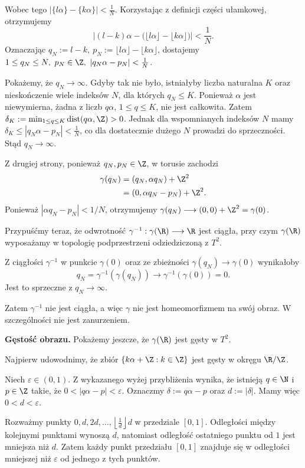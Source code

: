 \begin{uwaga}
Wobec tego $|\{l\alpha\}-\{k\alpha\}|<\frac1N$.
Korzystając z definicji części ułamkowej,
otrzymujemy
\[
\left|
(l-k)\alpha-
\bigl(\lfloor l\alpha\rfloor
-\lfloor k\alpha\rfloor\bigr)
\right|<\frac1N.
\]
Oznaczając $q_N:=l-k,\ p_N:=\lfloor l\alpha\rfloor -\lfloor k\alpha\rfloor$,
dostajemy $1\le q_N\le N,\ p_N\in\Z, \ |q_N\alpha-p_N|<\frac1N$.

Pokażemy, że $q_N\to\infty$.
Gdyby tak nie było, istniałyby liczba
naturalna $K$ oraz nieskończenie wiele
indeksów $N$, dla których $q_N\le K$.
Ponieważ $\alpha$ jest niewymierna,
żadna z liczb $q\alpha$, $1\le q\le K$,
nie jest całkowita. Zatem $\delta_K:= \min_{1\le q\le K} \operatorname{dist}(q\alpha,\Z)>0$.
Jednak dla wspomnianych indeksów $N$ mamy $\delta_K \le |q_N\alpha-p_N| <\frac1N$,
co dla dostatecznie dużego $N$ prowadzi
do sprzeczności. Stąd $q_N\to\infty$.

Z drugiej strony, ponieważ $q_N,p_N\in\Z$,
w torusie zachodzi
\[
\begin{aligned}
\gamma(q_N)
&=(q_N,\alpha q_N)+\Z^2\\
&=(0,\alpha q_N-p_N)+\Z^2.
\end{aligned}
\]
Ponieważ $|\alpha q_N-p_N|<1/N$, otrzymujemy $\gamma(q_N)\longrightarrow(0,0)+\Z^2 =\gamma(0)$.

Przypuśćmy teraz, że odwrotność $\gamma^{-1}:\gamma(\R)\longrightarrow\R$
jest ciągła, przy czym $\gamma(\R)$
wyposażamy w topologię podprzestrzeni
odziedziczoną z $T^2$.

Z ciągłości $\gamma^{-1}$ w punkcie
$\gamma(0)$ oraz ze zbieżności
$\gamma(q_N)\to\gamma(0)$ wynikałoby
\[
q_N
=\gamma^{-1}(\gamma(q_N))
\longrightarrow
\gamma^{-1}(\gamma(0))=0.
\]
Jest to sprzeczne z $q_N\to\infty$.

Zatem $\gamma^{-1}$ nie jest ciągła,
a więc $\gamma$ nie jest homeomorfizmem
na swój obraz. W szczególności nie jest
zanurzeniem.

\smallskip
\noindent\textbf{Gęstość obrazu.}
Pokażemy jeszcze, że $\gamma(\R)$ jest
gęsty w $T^2$.

Najpierw udowodnimy, że zbiór $\{k\alpha+\Z:k\in\Z\}$
jest gęsty w okręgu $\R/\Z$.

Niech $\varepsilon\in(0,1)$.
Z wykazanego wyżej przybliżenia wynika,
że istnieją $q\in\N$ i $p\in\Z$ takie, że $0<|q\alpha-p|<\varepsilon$.
Oznaczmy $\delta:=q\alpha-p$ oraz
$d:=|\delta|$. Mamy więc $0<d<\varepsilon$.

Rozważmy punkty $0,d,2d,\ldots,\left\lfloor\frac1d\right\rfloor d$
w przedziale $[0,1]$.
Odległości między kolejnymi punktami
wynoszą $d$, natomiast odległość ostatniego
punktu od $1$ jest mniejsza niż $d$.
Zatem każdy punkt przedziału $[0,1]$
znajduje się w odległości mniejszej niż
$\varepsilon$ od jednego z tych punktów.


\end{uwaga}
